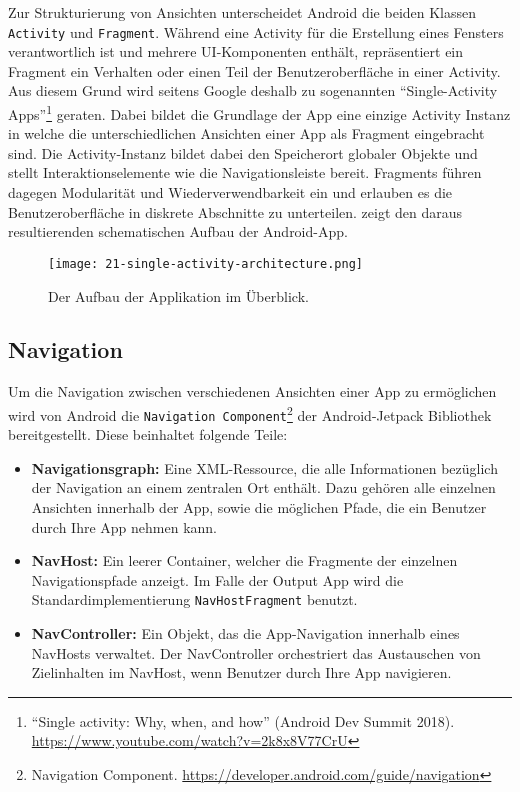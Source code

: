 Zur Strukturierung von Ansichten unterscheidet Android die beiden Klassen \texttt{Activity} und \texttt{Fragment}. Während eine Activity für die Erstellung eines Fensters verantwortlich ist und mehrere UI-Komponenten enthält, repräsentiert ein Fragment ein Verhalten oder einen Teil der Benutzeroberfläche in einer Activity. Aus diesem Grund wird seitens Google deshalb zu sogenannten \enquote{Single-Activity Apps}\footnote{\enquote{Single activity: Why, when, and how} (Android Dev Summit 2018). \newline \url{https://www.youtube.com/watch?v=2k8x8V77CrU}} geraten. Dabei bildet die Grundlage der App eine einzige Activity Instanz in welche die unterschiedlichen Ansichten einer App als Fragment eingebracht sind. Die Activity-Instanz bildet dabei den Speicherort globaler Objekte und stellt Interaktionselemente wie die Navigationsleiste bereit. Fragments führen dagegen Modularität und Wiederverwendbarkeit ein und erlauben es die Benutzeroberfläche in diskrete Abschnitte zu unterteilen.  zeigt den daraus resultierenden schematischen Aufbau der Android-App. 

\begin{figure}[H]
  \texttt{[image: 21-single-activity-architecture.png]}
  \caption{Der Aufbau der Applikation im Überblick.}\label{fig:single-activity-architecture}
\end{figure}

\subsection{Navigation}\label{subsec:navigation}

Um die Navigation zwischen verschiedenen Ansichten einer App zu ermöglichen wird von Android die \texttt{Navigation Component}\footnote{Navigation Component. \url{https://developer.android.com/guide/navigation}} der Android-Jetpack Bibliothek bereitgestellt. Diese beinhaltet folgende Teile:

\begin{itemize}
  \item \textbf{Navigationsgraph:} Eine XML-Ressource, die alle Informationen bezüglich der Navigation an einem zentralen Ort enthält. Dazu gehören alle einzelnen Ansichten innerhalb der App, sowie die möglichen Pfade, die ein Benutzer durch Ihre App nehmen kann.
  \item \textbf{NavHost:} Ein leerer Container, welcher die Fragmente der einzelnen Navigationspfade anzeigt. Im Falle der Output App wird die Standardimplementierung \texttt{NavHostFragment} benutzt.
  \item \textbf{NavController:} Ein Objekt, das die App-Navigation innerhalb eines NavHosts verwaltet. Der NavController orchestriert das Austauschen von Zielinhalten im NavHost, wenn Benutzer durch Ihre App navigieren.
\end{itemize}

